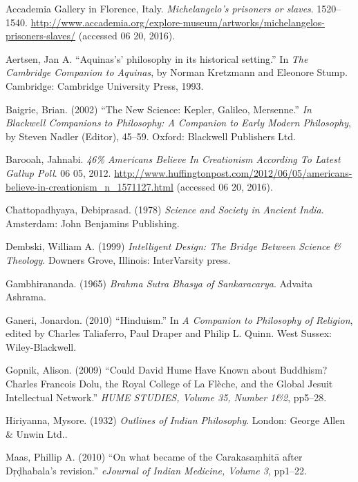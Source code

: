 \begin{thebibliography}{99}
\itemsep=2pt
Accademia Gallery in Florence, Italy. {\sl Michelangelo's prisoners or slaves}. 1520--1540. \url{http://www.accademia.org/explore-museum/artworks/michelangelos-prisoners-slaves/} (accessed 06 20, 2016).

Aertsen, Jan A. ``Aquinas's' philosophy in its historical setting.'' In {\sl The Cambridge Companion to Aquinas}, by Norman Kretzmann and Eleonore Stump. Cambridge: Cambridge University Press, 1993.

Baigrie, Brian. (2002) ``The New Science: Kepler, Galileo, Mersenne.'' {\sl In Blackwell Companions to Philosophy: A Companion to Early Modern Philosophy}, by Steven Nadler (Editor), 45--59. Oxford: Blackwell Publishers Ltd.

Barooah, Jahnabi. {\sl 46\% Americans Believe In Creationism According To Latest Gallup Poll}. 06 05, 2012. \url{http://www.huffingtonpost.com/2012/06/05/americans-believe-in-creationism_n_1571127.html} (accessed 06 20, 2016).

Chattopadhyaya, Debiprasad. (1978) {\sl Science and Society in Ancient India}. Amsterdam: John Benjamins Publishing.

Dembski, William A. (1999) {\sl Intelligent Design: The Bridge Between Science \& Theology}. Downers Grove, Illinois: InterVarsity press.

Gambhirananda. (1965) {\sl Brahma Sutra Bhasya of Sankaracarya}. Advaita Ashrama.

Ganeri, Jonardon. (2010) ``Hinduism.'' In {\sl A Companion to Philosophy of Religion}, edited by Charles Taliaferro, Paul Draper and Philip L. Quinn. West Sussex: Wiley-Blackwell.

Gopnik, Alison. (2009) ``Could David Hume Have Known about Buddhism? Charles Francois Dolu, the Royal College of La Flèche, and the Global Jesuit Intellectual Network.'' {\sl HUME STUDIES, Volume 35, Number 1\&2}, pp5--28.

Hiriyanna, Mysore. (1932) {\sl Outlines of Indian Philosophy}. London: George Allen \& Unwin Ltd..

Maas, Phillip A. (2010) ``On what became of the Carakasaṃhitā after Dṛḍhabala's revision.'' {\sl eJournal of Indian Medicine, Volume 3}, pp1--22.


\end{thebibliography}
